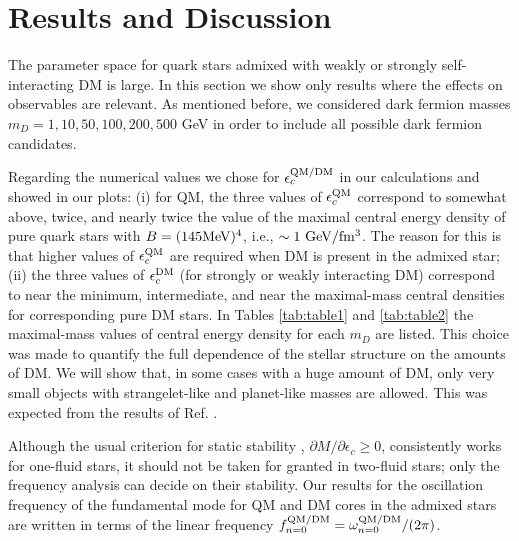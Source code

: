\documentclass[universe,article,accept,moreauthors,pdftex]{Definitions/mdpi}
\begin{document}
\section{Results and Discussion}
  \label{sec:results}

The parameter space for quark stars admixed with weakly or strongly self-interacting DM is large. In this section we show only results where the effects on observables are relevant. As mentioned before, we considered dark fermion masses $m_{D}= 1, 10, 50, 100, 200, 500$ GeV in order to include all possible dark fermion candidates. 

Regarding the numerical values we chose for $\epsilon^{\rm QM/DM}_{c}$ in our calculations and showed in our plots: (i) for QM, the three values of $\epsilon^{\rm QM}_{c}$ correspond to somewhat above, twice, and nearly twice the value of the maximal central energy density of pure quark stars with $B=(\rm 145 MeV)^{4}$, i.e., $\sim{1}~{\rm GeV/fm^{3}}$. The reason for this is that higher values of $\epsilon^{\rm QM}_{c}$ are required when DM is present in the admixed star; (ii) the three values of $\epsilon^{\rm DM}_{c}$ (for strongly or weakly interacting DM) correspond to near the minimum, intermediate, and near the maximal-mass central densities for corresponding pure DM stars. In Tables \ref{tab:table1} and \ref{tab:table2} the maximal-mass values of central energy density for each $m_{D}$ are listed. This choice was made to quantify the full dependence of the stellar structure on the amounts of DM. We will show that, in some cases with a huge amount of DM, only very small objects with strangelet-like and planet-like masses are allowed. This was expected from the results of Ref. \cite{Mukhopadhyay:2015xhs}.

Although the usual criterion for static stability , $\partial{M}/\partial{\epsilon_{c}}\geq0$, consistently works for one-fluid stars, it should not be taken for granted in two-fluid stars; only the frequency analysis can decide on their stability. Our results for the oscillation frequency of the fundamental mode for QM and DM cores in the admixed stars are written in terms of the linear frequency $f^{\rm QM/DM}_{n=0}=\omega^{\rm QM/DM}_{n=0}/(2\pi)$.
\end{document}
